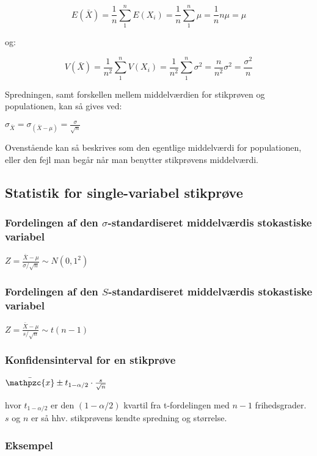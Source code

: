 \documentclass{article}
\newcommand{\mellemrum}{\vspace{2 ex}}
\newcommand{\cent}[1]{ \mellemrum \begin{center} #1\end{center} \mellemrum }
\newcommand{\centL}[1]{ \mellemrum \vspace{-20 px} \begin{center} $#1$\end{center} \mellemrum }
\newcommand{\parenthesis}[1]{\ensuremath{\left( #1 \right)}}
\newcommand{\script}[1]{\mathpzc{#1}}
\begin{document}
	\centL{$ E(\bar{X}) = \frac{1}{n}\sum_{1}^{n} E(X_i) = \frac{1}{n} \sum_{1}^{n} \mu = \frac{1}{n} n\mu = \mu  $}
	
	og:
	
	\centL{$ V(\bar{X}) = \frac{1}{n^2} \sum_{1}^{n}V(X_i) = \frac{1}{n^2} \sum_{1}^{n} \sigma^2 = \frac{n}{n^2} \sigma^2 = \frac{\sigma^2}{n} $}
	
	Spredningen, samt forskellen mellem middelværdien for stikprøven og populationen, kan så gives ved:
	
	\cent{$\sigma_{\bar{X}} = \sigma_{\parenthesis{\bar{X}-\mu}} = \frac{\sigma}{\sqrt{n}} $}
	
	Ovenstående kan så beskrives som den egentlige middelværdi for populationen, eller den fejl man begår når man benytter stikprøvens middelværdi.
	
	\subsection{Statistik for single-variabel stikprøve}
	
	\subsubsection{Fordelingen af den $\sigma$-standardiseret middelværdis stokastiske variabel}
	
	\cent{$ Z = \frac{\bar{X} - \mu}{\sigma / \sqrt{n}} \sim N(0,1^2) $}
	
	\subsubsection{Fordelingen af den $S$-standardiseret middelværdis stokastiske variabel}
	
	\cent{$ Z = \frac{\bar{X} - \mu}{s / \sqrt{n}} \sim t(n-1) $}
	
	\subsubsection{Konfidensinterval for en stikprøve}
	
	\cent{$ \bar{\script{x}}\pm t_{1-\alpha/2} \cdot \frac{s}{\sqrt{n}} $}
	
	hvor $t_{1-\alpha / 2}$ er den $(1-\alpha /2)$ kvartil fra t-fordelingen med $n-1$ frihedsgrader. $s$ og $n$ er så hhv. stikprøvens kendte spredning og størrelse.\\
	
	\subsubsection{Eksempel}
	
\end{document}
